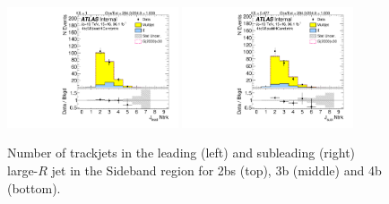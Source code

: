 \begin{figure}[htbp!]
\begin{center}
\includegraphics[width=0.45\textwidth,angle=-90]{figures/boosted/Sideband/b77_FourTag_Sideband_leadHCand_ntrk.pdf}
\includegraphics[width=0.45\textwidth,angle=-90]{figures/boosted/Sideband/b77_FourTag_Sideband_sublHCand_ntrk.pdf}
  \caption{Number of trackjets in the leading (left) and subleading (right) large-$R$ jet in the Sideband region for 2bs (top), 3b (middle) and 4b (bottom).}
  \label{fig:boosted-ntrk-Sideband}
\end{center}
\end{figure}

